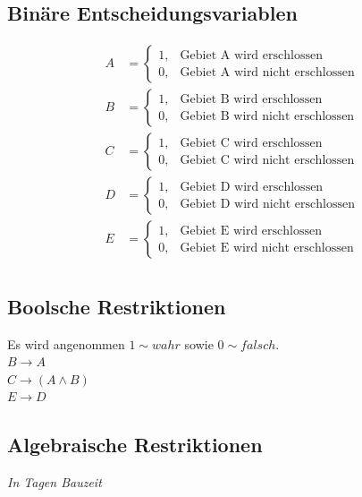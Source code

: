 \documentclass[a4paper,11pt]{article}
\begin{document}
\subsection*{Binäre Entscheidungsvariablen}
\begin{align*}
    A &= \begin{cases}
        1, & \text{Gebiet A wird erschlossen} \\
        0, & \text{Gebiet A wird nicht erschlossen}
    \end{cases} \\
    B &= \begin{cases}
        1, & \text{Gebiet B wird erschlossen} \\
        0, & \text{Gebiet B wird nicht erschlossen}
    \end{cases} \\
    C &= \begin{cases}
        1, & \text{Gebiet C wird erschlossen} \\
        0, & \text{Gebiet C wird nicht erschlossen}
    \end{cases} \\
    D &= \begin{cases}
        1, & \text{Gebiet D wird erschlossen} \\
        0, & \text{Gebiet D wird nicht erschlossen}
    \end{cases} \\
    E &= \begin{cases}
        1, & \text{Gebiet E wird erschlossen} \\
        0, & \text{Gebiet E wird nicht erschlossen}
    \end{cases} \\
\end{align*}

\pagebreak

\subsection*{Boolsche Restriktionen}
Es wird angenommen $1 \sim wahr$ sowie $0 \sim falsch$. \\

$B \to A$ \\
$C \to (A \land B)$ \\
$E \to D$ \\

\subsection*{Algebraische Restriktionen}
\textit{In Tagen Bauzeit} \newline
\end{document}
